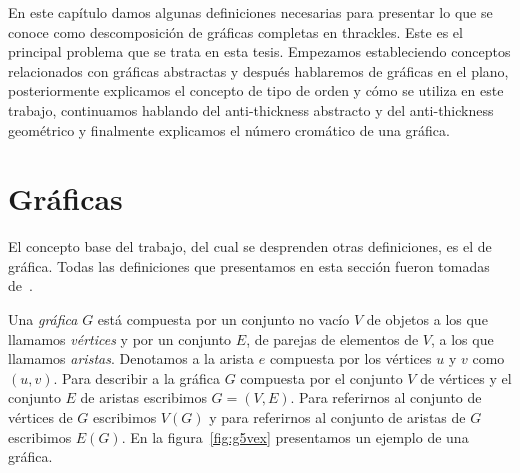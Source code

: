 En este capítulo damos algunas definiciones necesarias para presentar lo que
se conoce como descomposición de gráficas completas en thrackles. Este
es el principal problema que se trata en esta tesis.
Empezamos estableciendo conceptos relacionados con gráficas abstractas y después
hablaremos de gráficas en el plano, posteriormente explicamos el concepto de tipo de orden y cómo
se utiliza en este trabajo, continuamos hablando del anti-thickness abstracto
y del anti-thickness geométrico y finalmente explicamos el número cromático de una gráfica.

\section{Gráficas}
El concepto base del trabajo, del cual se desprenden otras definiciones, es el de gráfica.
Todas las definiciones que presentamos en esta sección fueron tomadas de~\cite{Chartrand2008}.

Una \emph{gráfica} $G$ está compuesta por un conjunto no vacío $V$ de objetos a los que llamamos \emph{vértices}
y por un conjunto $E$, de parejas de elementos de $V$, a los que llamamos \emph{aristas}. Denotamos
a la arista $e$ compuesta por los vértices $u$ y $v$ como $(u,v)$. Para describir a la gráfica $G$
compuesta por el conjunto $V$ de vértices y el conjunto $E$ de aristas escribimos $G=(V,E)$.
Para referirnos al conjunto de vértices de $G$ escribimos $V(G)$ y para referirnos
al conjunto de aristas de $G$ escribimos $E(G)$. En la figura~\ref{fig:g5vex} presentamos
un ejemplo de una gráfica.

